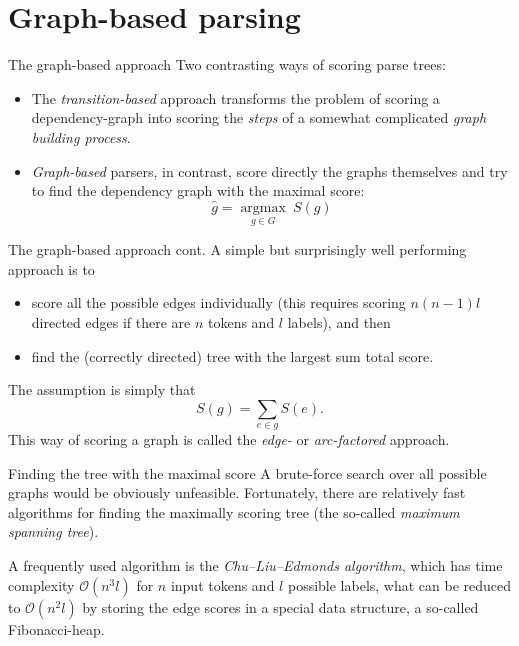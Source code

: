 \documentclass[style=upen, size=14pt]{powerdot}
\newcommand{\gold}{\color{arany}}
\theoremstyle{definition}
\begin{document}
\section{Graph-based parsing}

\begin{slide}[toc=Approach]{The graph-based approach}
  Two contrasting ways of scoring parse trees:
  \begin{itemize}
  \item The \emph{\gold transition-based} approach transforms the problem of
    scoring a dependency-graph into scoring the \emph{steps} of a somewhat
    complicated \emph{graph building process}.
  \item \emph{\gold Graph-based} parsers, in contrast, score directly the graphs
    themselves and try to find the dependency graph with the maximal score:
  $$\hat g =\underset{g\in G}{\operatorname{argmax}}~S(g)$$
  \end{itemize}
\end{slide}

\begin{slide}[toc=]{The graph-based approach cont.}
A simple but surprisingly well performing approach is to
\begin{itemize}
\item score all the possible edges individually (this requires scoring $n(n-1)l$
  directed edges if there are $n$ tokens and $l$ labels), and then
\item find the (correctly directed) tree with the largest sum total score.
\end{itemize}
The assumption is simply that
$$
S(g) = \sum_{e\in g} S(e).
$$
This way of scoring a graph is called the \emph{\gold edge-} or \emph{\gold
  arc-factored} approach.
\end{slide}

\begin{slide}[toc=Finding the maximum spanning tree]{Finding the tree with the
    maximal score}
  A brute-force search over all possible graphs would be obviously unfeasible.
  Fortunately, there are relatively fast algorithms for finding the maximally
  scoring tree (the so-called \emph{maximum spanning tree}). \bigskip

  A frequently used algorithm is the \emph{\gold Chu--Liu--Edmonds algorithm},
  which has time complexity $\mathcal O( n^3 l)$ for $n$ input tokens and $l$
  possible labels, what can be reduced to $\mathcal O(n^2l)$ by storing the edge
  scores in a special data structure, a so-called Fibonacci-heap.
\end{slide}
\end{document}
